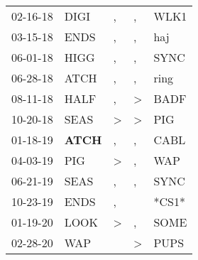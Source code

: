 \begin{supertabular}{p{0.07\textwidth}p{0.06\textwidth}p{0.02\textwidth}p{0.02\textwidth}p{0.06\textwidth}}
          02-16-18\textsuperscript{} &           DIGI\textsuperscript{} &                , &                , &           WLK1\textsuperscript{} \\
          03-15-18\textsuperscript{} &           ENDS\textsuperscript{} &                , &                , &            haj\textsuperscript{} \\
          06-01-18\textsuperscript{} &           HIGG\textsuperscript{} &                , &                , &           SYNC\textsuperscript{} \\
          06-28-18\textsuperscript{} &           ATCH\textsuperscript{} &                , &                , &           ring\textsuperscript{} \\
          08-11-18\textsuperscript{} &           HALF\textsuperscript{} &                , &     \textgreater &           BADF\textsuperscript{} \\
          10-20-18\textsuperscript{} &           SEAS\textsuperscript{} &     \textgreater &     \textgreater &            PIG\textsuperscript{} \\
          01-18-19\textsuperscript{} &  \textbf{ATCH\textsuperscript{}} &                , &                , &           CABL\textsuperscript{} \\
          04-03-19\textsuperscript{} &            PIG\textsuperscript{} &     \textgreater &                , &            WAP\textsuperscript{} \\
          06-21-19\textsuperscript{} &           SEAS\textsuperscript{} &                , &                , &           SYNC\textsuperscript{} \\
          10-23-19\textsuperscript{} &           ENDS\textsuperscript{} &                , &                  &                            *CS1* \\
          01-19-20\textsuperscript{} &           LOOK\textsuperscript{} &     \textgreater &                , &           SOME\textsuperscript{} \\
          02-28-20\textsuperscript{} &            WAP\textsuperscript{} &                  &     \textgreater &           PUPS\textsuperscript{} \\
\end{supertabular}
